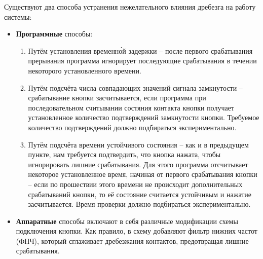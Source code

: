 \documentclass[../sparc.tex]{subfiles}
\begin{document}
Существуют два способа устранения нежелательного влияния дребезга на работу
системы:
\begin{itemize}
\item \textbf{Программные} способы:
  \begin{enumerate}
  \item Путём установления временн\'ой задержки -- после первого срабатывания
    прерывания программа игнорирует последующие срабатывания в течении
    некоторого установленного времени.
  \item Путём подсчёта числа совпадающих значений сигнала замкнутости --
    срабатывание кнопки засчитывается, если программа при последовательном
    считывании состяния контакта кнопки получает установленное количество
    подтверждений замкнутости кнопки.  Требуемое количество подтверждений должно
    подбираться экспериментально.
  \item Путём подсчёта времени устойчивого состояния -- как и в предыдущем
    пункте, нам требуется подтвердить, что кнопка нажата, чтобы игнорировать
    лишние срабатывания.  Для этого программа отсчитывает некоторое
    установленное время, начиная от первого срабатывания кнопки -- если по
    прошествии этого времени не происходит дополнительных срабатываний кнопки,
    то её состояние считается устойчивым и нажатие засчитывается.  Время
    проверки должно подбираться экспериментально.
  \end{enumerate}
\item \textbf{Аппаратные} способы включают в себя различные модификации схемы
  подключения кнопки.  Как правило, в схему добавляют фильтр нижних частот
  (ФНЧ), который сглаживает дребезжания контактов, предотвращая лишние
  срабатывания.
\end{itemize}
\end{document}
